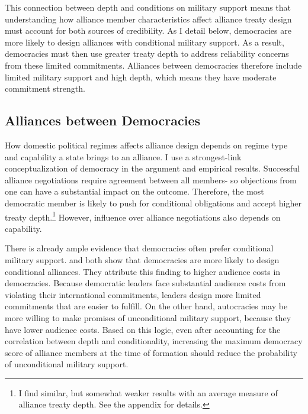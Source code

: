 \documentclass[12pt]{article}
\begin{document}
This connection between depth and conditions on military support means that understanding how alliance member characteristics affect alliance treaty design must account for both sources of credibility.  
As I detail below, democracies are more likely to design alliances with conditional military support. 
As a result, democracies must then use greater treaty depth to address reliability concerns from these limited commitments.
Alliances between democracies therefore include limited military support and high depth, which means they have moderate commitment strength. 


\subsection{Alliances between Democracies}


How domestic political regimes affects alliance design depends on regime type and capability a state brings to an alliance. 
I use a strongest-link conceptualization of democracy in the argument and empirical results. 
Successful alliance negotiations require agreement between all members- so objections from one can have a substantial impact on the outcome.  
Therefore, the most democratic member is likely to push for conditional obligations and accept higher treaty depth.\footnote{I find similar, but somewhat weaker results with an average measure of alliance treaty depth. See the appendix for details.}
However, influence over alliance negotiations also depends on capability. 


There is already ample evidence that democracies often prefer conditional military support. 
\citet{Mattes2012} and \citet{Chibaetal2015} both show that democracies are more likely to design conditional alliances. 
They attribute this finding to higher audience costs in democracies. 
Because democratic leaders face substantial audience costs from violating their international commitments, leaders design more limited commitments that are easier to fulfill. 
On the other hand, autocracies may be more willing to make promises of unconditional military support, because they have lower audience costs. 
Based on this logic, even after accounting for the correlation between depth and conditionality, increasing the maximum democracy score of alliance members at the time of formation should reduce the probability of unconditional military support.
\end{document}

